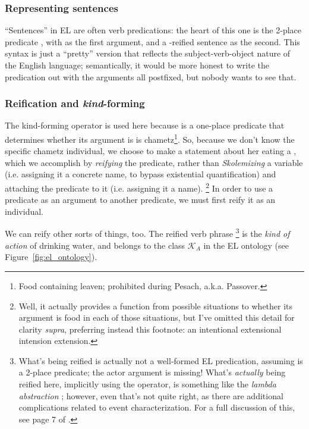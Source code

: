 \subsubsection{Representing sentences}
``Sentences'' in EL are often verb predications: the heart of this one is the 2-place predicate , with  as the first argument, and a -reified sentence as the second. This syntax is just a ``pretty'' version that reflects the subject-verb-object nature of the English language; semantically, it would be more honest to write the predication out with the arguments all postfixed, but nobody wants to see that.

\subsubsection{Reification and \textit{kind}-forming}
The kind-forming operator  is used here because  is a one-place predicate that determines whether its argument is is chametz\footnote{Food containing leaven; prohibited during Pesach, a.k.a. Passover.}. So, because we don't know the specific chametz individual, we choose to make a statement about her eating a , which we accomplish by \textit{reifying} the  predicate, rather than \textit{Skolemizing} a variable (i.e. assigning it a concrete name, to bypass existential quantification) and attaching the predicate to it (i.e. assigning it a name).
\footnote{Well, it actually provides a function from possible situations to whether its argument is food in each of those situations, but I've omitted this detail for clarity \textit{supra}, preferring instead this footnote: an intentional extensional intension extension.}
In order to use a predicate as an argument to another predicate, we must first reify it as an individual.

We can reify other sorts of things, too. The reified verb phrase 
\footnote{What's being reified is actually not a well-formed EL predication, assuming  is a 2-place predicate; the actor argument is missing! What's \textit{actually} being reified here, implicitly using the  operator, is something like the \textit{lambda abstraction} ; however, even that's not quite right, as there are additional complications related to event characterization. For a full discussion of this, see page 7 of \citep{schubert2000episodic}.}
is the \textit{kind of action} of drinking water, and belongs to the class $\mathcal{K}_{A}$ in the EL ontology (see Figure~\ref{fig:el_ontology}). 

